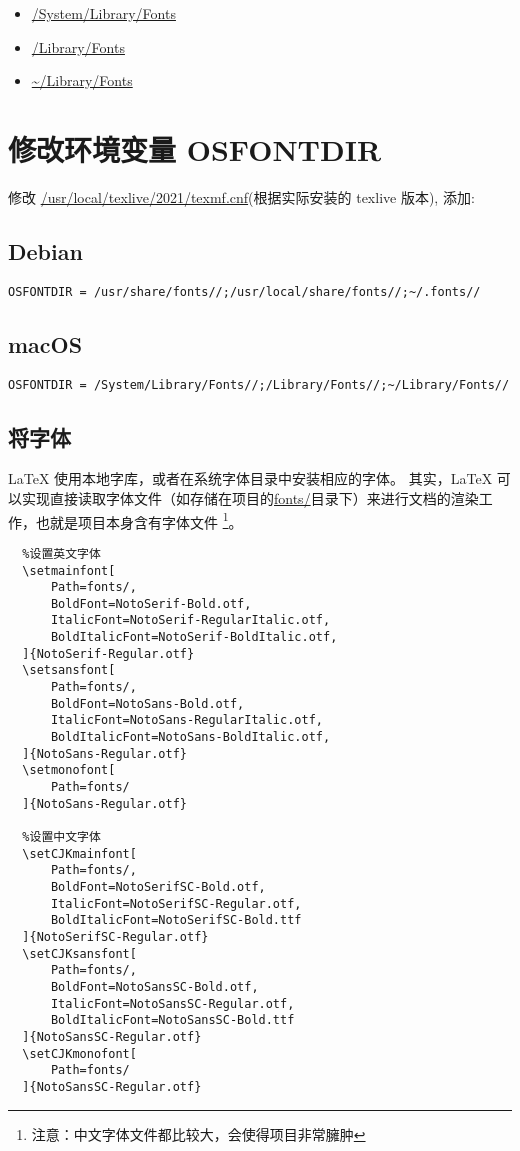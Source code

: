 \begin{itemize}
  \item \url{/System/Library/Fonts}
  \item \url{/Library/Fonts}
  \item \url{~/Library/Fonts}
\end{itemize}

\section{修改环境变量 {\ttfamily OSFONTDIR}}

修改 \url{/usr/local/texlive/2021/texmf.cnf}(根据实际安装的 texlive 版本), 添加:

\subsection{Debian}

\begin{verbatim}
OSFONTDIR = /usr/share/fonts//;/usr/local/share/fonts//;~/.fonts//
\end{verbatim}

\subsection{macOS}

\begin{verbatim}
OSFONTDIR = /System/Library/Fonts//;/Library/Fonts//;~/Library/Fonts//
\end{verbatim}

\subsection{将字体}

{\LaTeX} 使用本地字库，或者在系统字体目录中安装相应的字体。
其实，{\LaTeX} 可以实现直接读取字体文件（如存储在项目的\url{fonts/}目录下）来进行文档的渲染工作，也就是项目本身含有字体文件
\footnote{注意：中文字体文件都比较大，会使得项目非常臃肿}。

\begin{verbatim}
  %设置英文字体
  \setmainfont[
      Path=fonts/,
      BoldFont=NotoSerif-Bold.otf,
      ItalicFont=NotoSerif-RegularItalic.otf,
      BoldItalicFont=NotoSerif-BoldItalic.otf,
  ]{NotoSerif-Regular.otf}
  \setsansfont[
      Path=fonts/,
      BoldFont=NotoSans-Bold.otf,
      ItalicFont=NotoSans-RegularItalic.otf,
      BoldItalicFont=NotoSans-BoldItalic.otf,
  ]{NotoSans-Regular.otf}
  \setmonofont[
      Path=fonts/
  ]{NotoSans-Regular.otf}
   
  %设置中文字体
  \setCJKmainfont[
      Path=fonts/,
      BoldFont=NotoSerifSC-Bold.otf, 
      ItalicFont=NotoSerifSC-Regular.otf, 
      BoldItalicFont=NotoSerifSC-Bold.ttf
  ]{NotoSerifSC-Regular.otf}
  \setCJKsansfont[
      Path=fonts/,
      BoldFont=NotoSansSC-Bold.otf, 
      ItalicFont=NotoSansSC-Regular.otf, 
      BoldItalicFont=NotoSansSC-Bold.ttf
  ]{NotoSansSC-Regular.otf}
  \setCJKmonofont[
      Path=fonts/
  ]{NotoSansSC-Regular.otf}
\end{verbatim}

